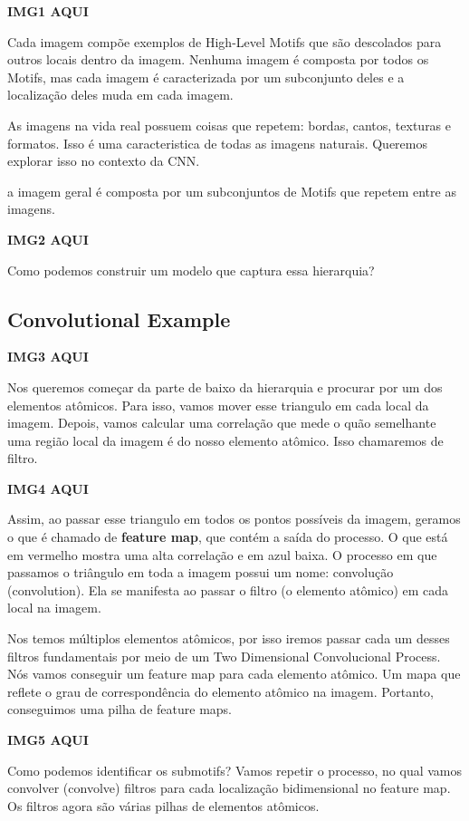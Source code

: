 \documentclass[11pt, a4paper]{article}
\begin{document}
\textbf{IMG1 AQUI}

Cada imagem compõe exemplos de High-Level Motifs que são descolados para outros locais dentro da imagem. Nenhuma imagem é composta por todos os Motifs, mas cada imagem é caracterizada por um subconjunto deles e a localização deles muda em cada imagem.

As imagens na vida real possuem coisas que repetem: bordas, cantos, texturas e formatos. Isso é uma caracteristica de todas as imagens naturais. Queremos explorar isso no contexto da CNN.

a imagem geral é composta por um subconjuntos de Motifs que repetem entre as imagens.

\textbf{IMG2 AQUI}

Como podemos construir um modelo que captura essa hierarquia?

\subsection{Convolutional Example}

\textbf{IMG3 AQUI}

Nos queremos começar da parte de baixo da hierarquia e procurar por um dos elementos atômicos. Para isso, vamos mover esse triangulo em cada local da imagem. Depois, vamos calcular uma correlação que mede o quão semelhante uma região local da imagem é do nosso elemento atômico. Isso chamaremos de filtro.

\textbf{IMG4 AQUI}

Assim, ao passar esse triangulo em todos os pontos possíveis da imagem, geramos o que é chamado de \textbf{feature map}, que contém a saída do processo. O que está em vermelho mostra uma alta correlação e em azul baixa. O processo em que passamos o triângulo em toda a imagem possui um nome: convolução (convolution). Ela se manifesta ao passar o filtro (o elemento atômico) em cada local na imagem.

Nos temos múltiplos elementos atômicos, por isso iremos passar cada um desses filtros fundamentais por meio de um Two Dimensional Convolucional Process. Nós vamos conseguir um feature map para cada elemento atômico. Um mapa que reflete o grau de correspondência do elemento atômico na imagem. Portanto, conseguimos uma pilha de feature maps.

\textbf{IMG5 AQUI}

Como podemos identificar os submotifs? Vamos repetir o processo, no qual vamos convolver (convolve) filtros para cada localização bidimensional no feature map. Os filtros agora são várias pilhas de elementos atômicos.
\end{document}
